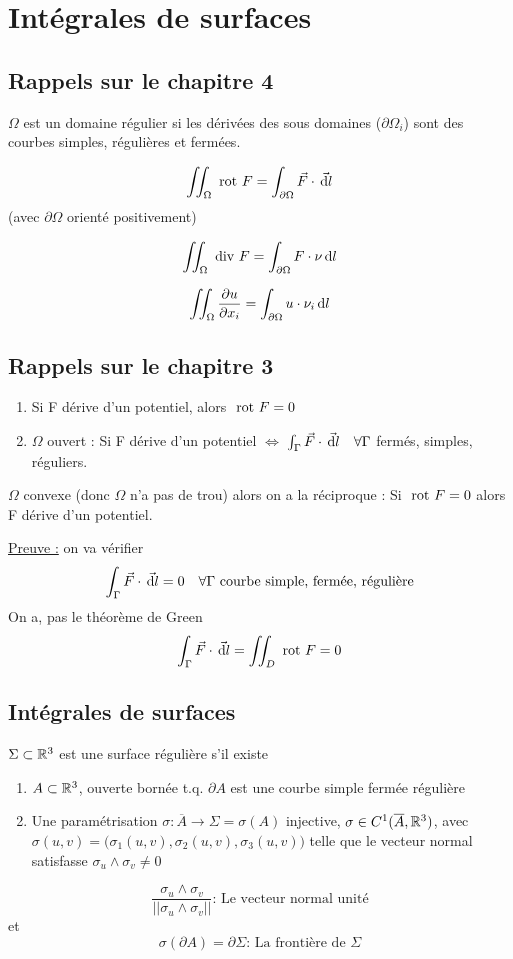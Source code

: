 \documentclass[12pt,a4paper]{article}
\begin{document}
\section{Intégrales de surfaces}
\subsection{Rappels sur le chapitre 4}
$\Omega$ est un domaine régulier si les dérivées des sous domaines ($\partial \Omega_i$) sont des courbes simples, régulières et fermées.

\[\iint_\Omega \text{ rot } F = \int_{\partial\Omega} \vec{F}\cdot \vec{\, \mathrm d l}\]
(avec $\partial \Omega$ orienté positivement)

\[\iint_\Omega \text{ div } F = \int_{\partial\Omega} F \cdot \nu \, \mathrm d l\]

\[\iint_\Omega \frac{\partial u}{\partial x_i} = \int_{\partial\Omega} u \cdot \nu_i \, \mathrm d l\]

\subsection{Rappels sur le chapitre 3}
\begin{enumerate}
	\item 	Si F dérive d'un potentiel, alors $\text{ rot } F = 0$
	\item 	$\Omega$ ouvert : Si F dérive d'un potentiel $\iff$ $\int_\Gamma \vec{F}\cdot \vec{\, \mathrm d l} \quad \forall \Gamma$ fermés, simples, réguliers.
\end{enumerate}
 $\Omega$ convexe (donc $\Omega$ n'a pas de trou) alors on a la réciproque : Si $\text{ rot } F = 0$ alors F dérive d'un potentiel.

\uline{Preuve :} on va vérifier
\[\int_\Gamma \vec{F}\cdot\vec{\, \mathrm d l} = 0 \quad \forall \Gamma \text{ courbe simple, fermée, régulière}\]
On a, pas le théorème de Green 
\[\int_\Gamma \vec{F} \cdot \vec{\, \mathrm d l} = \iint_D \text{ rot } F = 0\]

\subsection{Intégrales de surfaces}
\begin{boite}
	 $\Sigma \subset \mathbb{R}^3$ est une surface régulière s'il existe 
	\begin{enumerate}
		\item 	$A \subset \mathbb{R}^3$, ouverte bornée t.q. $\partial A$ est une courbe simple fermée régulière
		\item 	Une paramétrisation $\sigma : \overline{A} \to \Sigma = \sigma(A)$ injective, $\sigma \in C^1(\overline{A},\mathbb{R}^3)$, avec $\sigma(u,v) = \Big(\sigma_1(u,v),\sigma_2(u,v),\sigma_3(u,v)\Big)$ telle que le vecteur normal satisfasse $\sigma_u \wedge \sigma_v \neq 0$
	\end{enumerate}
	 \[\frac{\sigma_u \wedge \sigma_v}{||\sigma_u \wedge \sigma_v||} \text{: Le vecteur normal unité}\]
	et
	\[\sigma(\partial A) =  \partial\Sigma \text{: La frontière de } \Sigma\]
\end{boite}
\end{document}
